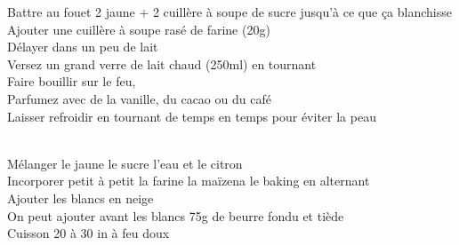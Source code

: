 \begin{minipage}[c]{\textwidth}
Battre au fouet 2 jaune + 2 cuillère à soupe de sucre jusqu'à ce que ça blanchisse\\
Ajouter une cuillère à soupe rasé de farine (20g)\\
Délayer dans un peu de lait\\
Versez un grand verre de lait chaud (250ml) en tournant\\
Faire bouillir sur le feu,\\
Parfumez avec de la vanille, du cacao ou du café\\
Laisser refroidir en tournant de temps en temps pour éviter la peau\\
\\

\end{minipage}

\begin{minipage}[c]{\textwidth}
Mélanger le jaune le sucre l'eau et le citron\\
Incorporer petit à petit la farine la maïzena le baking en alternant\\
Ajouter les blancs en neige\\
On peut ajouter avant les blancs 75g de beurre fondu et tiède\\
Cuisson 20 à 30 in à feu doux\\
\\

\end{minipage}

